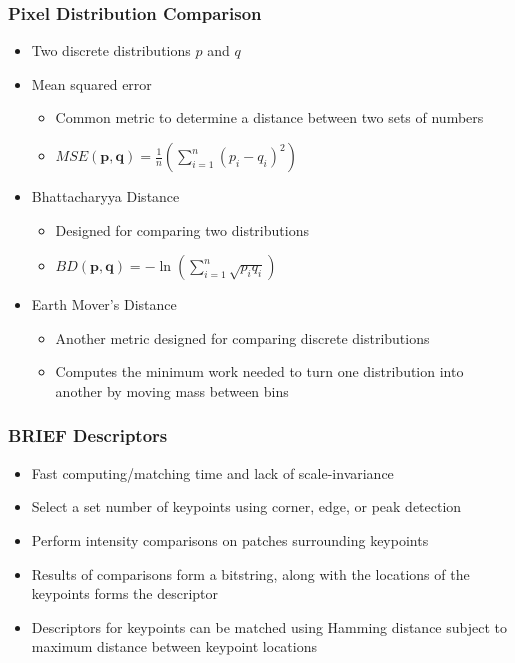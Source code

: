 \documentclass{beamer}
\begin{document}
\begin{frame}
\frametitle{Pixel Distribution Comparison}
\begin{itemize}
  \item Two discrete distributions $p$ and $q$
  \item Mean squared error
  \begin{itemize}
    \item Common metric to determine a distance between two sets of numbers
    \item $MSE(\mathbf{p}, \mathbf{q}) = \frac{1}{n} \left( \sum_{i=1}^n{(p_i-q_i)^2} \right)$
  \end{itemize}
  \item Bhattacharyya Distance
  \begin{itemize}
    \item Designed for comparing two distributions
    \item $BD(\mathbf{p}, \mathbf{q}) = - \ln \left( \sum_{i=1}^n {\sqrt{p_iq_i}} \right)$
  \end{itemize}
  \item Earth Mover's Distance
  \begin{itemize}
    \item Another metric designed for comparing discrete distributions
    \item Computes the minimum work needed to turn one distribution into another by moving mass between bins
  \end{itemize}
\end{itemize}
\end{frame}

\begin{frame}
\frametitle{BRIEF Descriptors}
\begin{itemize}
  \item Fast computing/matching time and lack of scale-invariance
  \item Select a set number of keypoints using corner, edge, or peak detection
  \item Perform intensity comparisons on patches surrounding keypoints
  \item Results of comparisons form a bitstring, along with the locations of the keypoints forms the descriptor
  \item Descriptors for keypoints can be matched using Hamming distance subject to maximum distance between keypoint locations
\end{itemize}
\end{frame}
\end{document}
